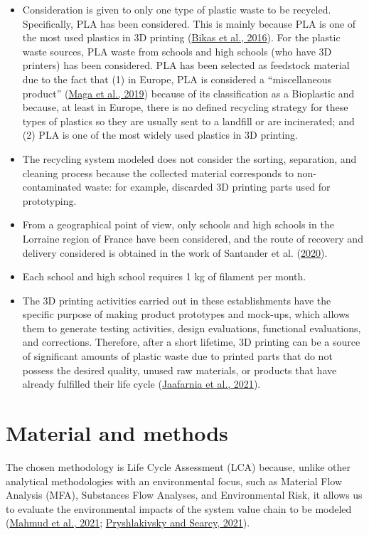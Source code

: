 \documentclass[12pt]{elsarticle} %
\begin{document}
\begin{itemize}
\item
  Consideration is given to only one type of plastic waste to be recycled.
  Specifically, PLA has been considered.
  This is mainly because PLA is one of the most used plastics in 3D printing (\protect\hyperlink{ref-bikas2016}{Bikas et al., 2016}).
  For the plastic waste sources, PLA waste from schools and high schools (who have 3D printers) has been considered.
  PLA has been selected as feedstock material due to the fact that (1) in Europe, PLA is considered a ``miscellaneous product'' (\protect\hyperlink{ref-maga2019}{Maga et al., 2019}) because of its classification as a Bioplastic and because, at least in Europe, there is no defined recycling strategy for these types of plastics so they are usually sent to a landfill or are incinerated;
  and (2) PLA is one of the most widely used plastics in 3D printing.
\item
  The recycling system modeled does not consider the sorting, separation, and cleaning process because the collected material corresponds to non-contaminated waste: for example, discarded 3D printing parts used for prototyping.
\item
  From a geographical point of view, only schools and high schools in the Lorraine region of France have been considered, and the route of recovery and delivery considered is obtained in the work of Santander et al. (\protect\hyperlink{ref-Santander2020}{2020}).
\item
  Each school and high school requires 1 kg of filament per month.
\item
  The 3D printing activities carried out in these establishments have the specific purpose of making product prototypes and mock-ups, which allows them to generate testing activities, design evaluations, functional evaluations, and corrections.
  Therefore, after a short lifetime, 3D printing can be a source of significant amounts of plastic waste due to printed parts that do not possess the desired quality, unused raw materials, or products that have already fulfilled their life cycle (\protect\hyperlink{ref-Jaafarnia2021}{Jaafarnia et al., 2021}).
\end{itemize}

\hypertarget{MM}{%
\section{Material and methods}\label{MM}}

The chosen methodology is Life Cycle Assessment (LCA) because, unlike other analytical methodologies with an environmental focus, such as Material Flow Analysis (MFA), Substances Flow Analyses, and Environmental Risk, it allows us to evaluate the environmental impacts of the system value chain to be modeled (\protect\hyperlink{ref-Mahmud2021}{Mahmud et al., 2021}; \protect\hyperlink{ref-Pryshlakivsky2021}{Pryshlakivsky and Searcy, 2021}).
\end{document}
